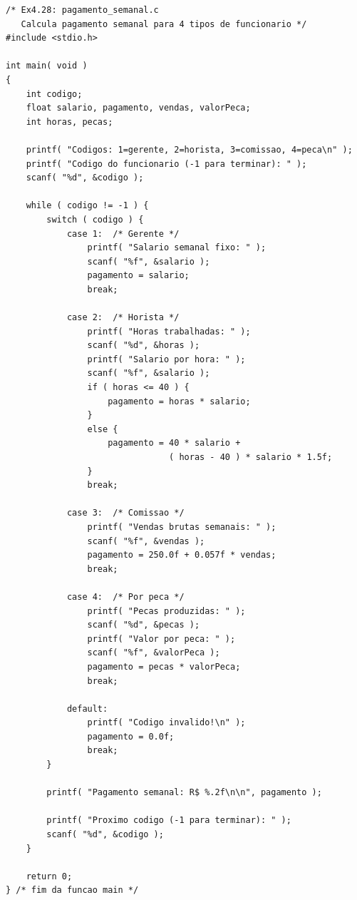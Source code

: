 \documentclass[12pt,a4paper]{article}
\begin{document}
\begin{respostabox}
\begin{lstlisting}
/* Ex4.28: pagamento_semanal.c
   Calcula pagamento semanal para 4 tipos de funcionario */
#include <stdio.h>

int main( void )
{
    int codigo;
    float salario, pagamento, vendas, valorPeca;
    int horas, pecas;

    printf( "Codigos: 1=gerente, 2=horista, 3=comissao, 4=peca\n" );
    printf( "Codigo do funcionario (-1 para terminar): " );
    scanf( "%d", &codigo );

    while ( codigo != -1 ) {
        switch ( codigo ) {
            case 1:  /* Gerente */
                printf( "Salario semanal fixo: " );
                scanf( "%f", &salario );
                pagamento = salario;
                break;

            case 2:  /* Horista */
                printf( "Horas trabalhadas: " );
                scanf( "%d", &horas );
                printf( "Salario por hora: " );
                scanf( "%f", &salario );
                if ( horas <= 40 ) {
                    pagamento = horas * salario;
                }
                else {
                    pagamento = 40 * salario +
                                ( horas - 40 ) * salario * 1.5f;
                }
                break;

            case 3:  /* Comissao */
                printf( "Vendas brutas semanais: " );
                scanf( "%f", &vendas );
                pagamento = 250.0f + 0.057f * vendas;
                break;

            case 4:  /* Por peca */
                printf( "Pecas produzidas: " );
                scanf( "%d", &pecas );
                printf( "Valor por peca: " );
                scanf( "%f", &valorPeca );
                pagamento = pecas * valorPeca;
                break;

            default:
                printf( "Codigo invalido!\n" );
                pagamento = 0.0f;
                break;
        }

        printf( "Pagamento semanal: R$ %.2f\n\n", pagamento );

        printf( "Proximo codigo (-1 para terminar): " );
        scanf( "%d", &codigo );
    }

    return 0;
} /* fim da funcao main */
\end{lstlisting}
\end{respostabox}
\end{document}
